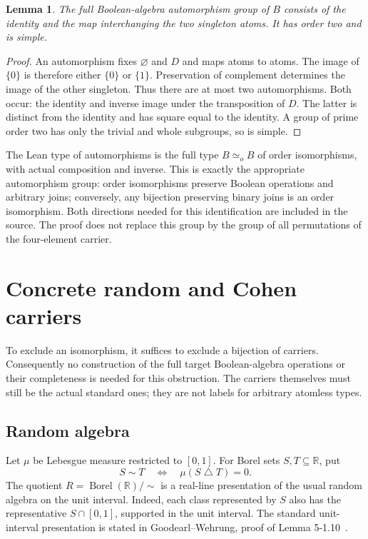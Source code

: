 \documentclass[11pt]{article}
\newcommand{\Borel}{\operatorname{Borel}}
\newtheorem{lemma}{Lemma}
\begin{document}
\begin{lemma}
The full Boolean-algebra automorphism group of $B$ consists of the identity and the map interchanging the two singleton atoms. It has order two and is simple.
\end{lemma}
\begin{proof}
An automorphism fixes $\varnothing$ and $D$ and maps atoms to atoms. The image of $\{0\}$ is therefore either $\{0\}$ or $\{1\}$. Preservation of complement determines the image of the other singleton. Thus there are at most two automorphisms. Both occur: the identity and inverse image under the transposition of $D$. The latter is distinct from the identity and has square equal to the identity. A group of prime order two has only the trivial and whole subgroups, so is simple.
\end{proof}
The Lean type of automorphisms is the full type $B\simeq_o B$ of order isomorphisms, with actual composition and inverse. This is exactly the appropriate automorphism group: order isomorphisms preserve Boolean operations and arbitrary joins; conversely, any bijection preserving binary joins is an order isomorphism. Both directions needed for this identification are included in the source. The proof does not replace this group by the group of all permutations of the four-element carrier.

\section{Concrete random and Cohen carriers}
To exclude an isomorphism, it suffices to exclude a bijection of carriers. Consequently no construction of the full target Boolean-algebra operations or their completeness is needed for this obstruction. The carriers themselves must still be the actual standard ones; they are not labels for arbitrary atomless types.

\subsection{Random algebra}
Let $\mu$ be Lebesgue measure restricted to $[0,1]$. For Borel sets $S,T\subseteq\mathbb R$, put
\[
S\sim T\quad\Longleftrightarrow\quad \mu(S\mathbin{\triangle}T)=0.
\]
The quotient $R=\Borel(\mathbb R)/{\sim}$ is a real-line presentation of the usual random algebra on the unit interval. Indeed, each class represented by $S$ also has the representative $S\cap[0,1]$, supported in the unit interval. The standard unit-interval presentation is stated in Goodearl--Wehrung, proof of Lemma 5-1.10~\cite{GW}.
\end{document}
